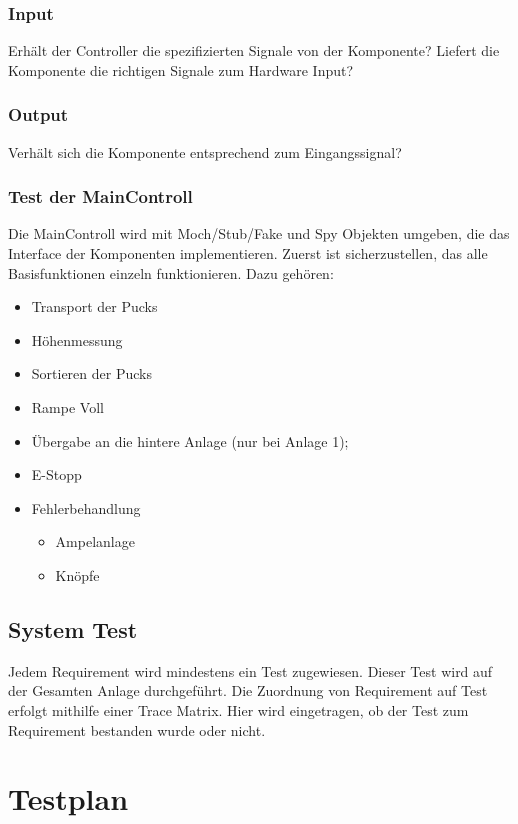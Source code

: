
\subsubsection{Input}
Erhält der Controller die spezifizierten Signale von der Komponente? Liefert die Komponente die richtigen Signale zum Hardware Input?

\subsubsection{Output}
Verhält sich die Komponente entsprechend zum Eingangssignal?

\subsubsection{Test der MainControll}
Die MainControll wird mit Moch/Stub/Fake und Spy Objekten umgeben, die das Interface der Komponenten implementieren.
Zuerst ist sicherzustellen, das alle Basisfunktionen einzeln funktionieren. Dazu gehören:
\begin{itemize} 
	\item Transport der Pucks
	\item Höhenmessung
	\item Sortieren der Pucks
	\item Rampe Voll
	\item Übergabe an die hintere Anlage (nur bei Anlage 1);
	\item E-Stopp
	\item Fehlerbehandlung
	\begin{itemize}
		\item Ampelanlage
		\item Knöpfe
	\end{itemize}
\end{itemize}

\subsection{System Test}
Jedem Requirement wird mindestens ein Test zugewiesen. Dieser Test wird auf der Gesamten Anlage durchgeführt. 
Die Zuordnung von Requirement auf Test erfolgt mithilfe einer Trace Matrix.
Hier wird eingetragen, ob der Test zum Requirement bestanden wurde oder nicht.

\section{Testplan}
